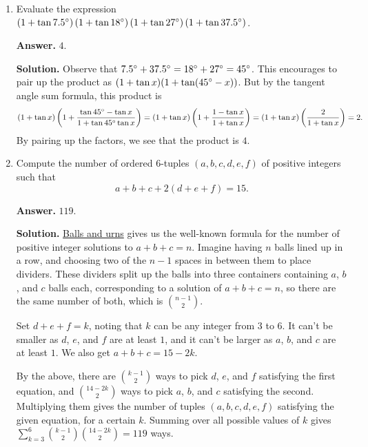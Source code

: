 \documentclass[11pt,paper=letter]{scrartcl}
\begin{document}
\begin{enumerate}[left=0pt]
\item Evaluate the expression $\left( 1 + \tan7.5^\circ \right)\left( 1 + \tan 18^\circ \right)\left( 1 + \tan27^\circ \right)\left( 1 + \tan37.5^\circ \right)$.

{\sffamily \bfseries Answer.} $\boxed{4}$.

{\sffamily \bfseries Solution.} Observe that $7.5^\circ + 37.5^\circ = 18^\circ + 27^\circ = 45^\circ$. This encourages to pair up the product as $(1 + \tan x)(1 + \tan(45^\circ - x))$. But by the tangent angle sum formula, this product is
$$(1 + \tan x)\left( 1 + \frac{\tan 45^\circ - \tan x}{1 + \tan45^\circ \tan x} \right) = \left( 1 + \tan x \right)\left( 1 + \frac{1 - \tan x}{1 + \tan x} \right) = \left( 1 + \tan x \right)\left( \frac2{1 + \tan x} \right) = 2.$$
By pairing up the factors, we see that the product is $4$.

\item Compute the number of ordered $6$-tuples $(a,b,c,d,e,f)$ of positive integers such that $$a + b + c + 2(d+e+f) = 15.$$

{\sffamily \bfseries Answer.} $\boxed{119}$.

{\sffamily \bfseries Solution.} \href{https://en.wikipedia.org/wiki/Stars_and_bars_(combinatorics)#Theorem_one}{Balls and urns} gives us the well-known formula for the number of positive integer solutions to $a + b + c = n$. Imagine having $n$ balls lined up in a row, and choosing two of the $n-1$ spaces in between them to place dividers. These dividers split up the balls into three containers containing $a$, $b$, and $c$ balls each, corresponding to a solution of $a + b + c = n$, so there are the same number of both, which is $\displaystyle \binom{n-1}2$.

Set $d + e + f = k$, noting that $k$ can be any integer from $3$ to $6$. It can't be smaller as $d$, $e$, and $f$ are at least $1$, and it can't be larger as $a$, $b$, and $c$ are at least $1$. We also get $a + b + c = 15 - 2k$.

By the above, there are $\displaystyle \binom{k-1}{2}$ ways to pick $d$, $e$, and $f$ satisfying the first equation, and $\displaystyle \binom{14-2k}{2}$ ways to pick $a$, $b$, and $c$ satisfying the second. Multiplying them gives the number of tuples $(a, b, c, d, e, f)$ satisfying the given equation, for a certain $k$. Summing over all possible values of $k$ gives $\displaystyle \sum_{k=3}^6 \binom{k-1}{2}\binom{14-2k}{2} = 119$ ways.


\end{enumerate}
\end{document}
